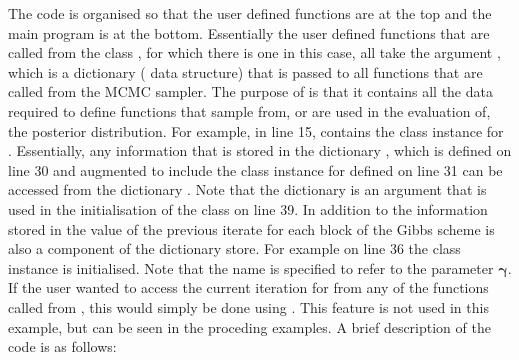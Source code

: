 \documentclass[article]{jss}
\begin{document}
The code is organised so that the user defined functions are at the
top and the main program is at the bottom.  Essentially the user
defined functions that are called from the class , for
which there is one in this case, all take the argument ,
which is a dictionary ( data structure) that is
passed to all functions that are called from the MCMC sampler.  The
purpose of  is that it contains all the data required to
define functions that sample from, or are used in the evaluation of,
the posterior distribution. For example, in line 15,
 contains the class instance for
.  Essentially, any information that is stored
in the dictionary , which is defined on line 30 and
augmented to include the class instance for 
defined on line 31 can be accessed from the dictionary .
Note that the dictionary  is an argument that is used in
the initialisation of the  class on line 39. In addition to
the information stored in  the value of the previous
iterate for each block of the Gibbs scheme is also a component of the
dictionary store. For example on line 36 the class instance
 is initialised. Note that the name  is
specified to refer to the parameter $\bm{\gamma}.$ If the user wanted
to access the current iteration for  from any of the
functions called from , this would simply be done using
.  This feature is not used in this example, but can
be seen in the proceding examples. A brief description of the code is
as follows:
\end{document}
